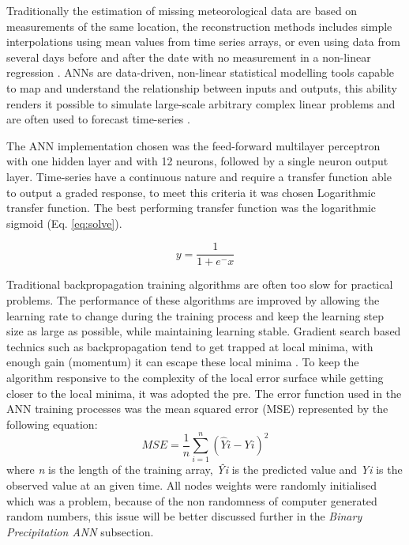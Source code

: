 Traditionally the estimation of missing meteorological data are based on measurements of the same location, the reconstruction methods includes simple interpolations using mean values from time series arrays, or even using data from several days before and after the date with no measurement in a non-linear regression \cite{kim2010reconstructing}. ANNs are data-driven, non-linear statistical modelling tools capable to map and understand the relationship  between inputs and outputs, this ability renders it possible to simulate large-scale arbitrary complex linear problems \cite{wu2006flood} and are often used to forecast time-series \cite{zhang2003time, box1976time, french1992rainfall, zhang1998linear}.

The ANN implementation chosen was the feed-forward multilayer perceptron with one hidden layer and with 12 neurons, followed by a single neuron output layer. Time-series have a continuous nature and require a transfer function able to output a graded response, to meet this criteria it was chosen Logarithmic transfer function. The best performing transfer function was the logarithmic sigmoid (Eq. \ref{eq:solve}).

\begin{equation}
\label{eq:solve}
y = \frac{1}{1 + e^-x}
\end{equation}

Traditional backpropagation training algorithms are often too slow for practical problems. The performance of these algorithms are improved by allowing the learning rate to change during the training process and keep the learning step size as large as possible, while maintaining learning stable. Gradient search based technics such as backpropagation tend to get trapped at local minima, with enough gain (momentum) it can escape these local minima \cite{montana1989training}. To keep the algorithm responsive to the complexity of the local error surface while getting closer to the local minima, it was adopted the pre. The error function used in the ANN training processes was the mean squared error (MSE) represented by the following equation:
\begin{equation}
\label{eq:solve2}
MSE = \frac{1}{n} \sum\limits_{i=1}^n (\hat{Y}i - Yi)^2
\end{equation}
where \textit{n} is the length of the training array, \textit{\^{Y}}\textit{i} is the predicted value and \textit{Yi} is the observed value at an given time. 
All nodes weights were randomly initialised which was a problem, because of the non randomness of computer generated random numbers, this issue will be better
discussed further in the \textit{Binary Precipitation ANN} subsection. 

